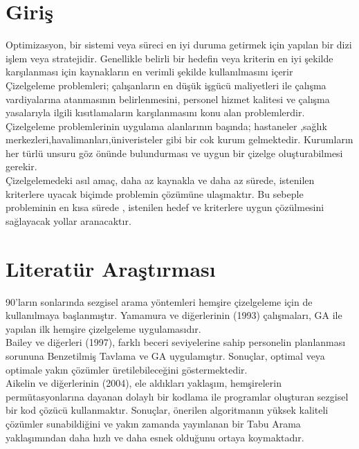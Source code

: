 \documentclass[12pt, a4paper]{article}
\begin{document}
\begin{flushleft}
   \section{Giriş}	
   Optimizasyon, bir sistemi veya süreci en iyi duruma getirmek için yapılan bir dizi işlem veya stratejidir. Genellikle belirli bir hedefin veya kriterin en iyi şekilde karşılanması için kaynakların en verimli şekilde kullanılmasını içerir \\[5pt]
   Çizelgeleme problemleri; çalışanların en düşük işgücü maliyetleri ile çalışma vardiyalarına	atanmasının belirlenmesini, personel hizmet kalitesi ve çalışma yasalarıyla ilgili 
   kısıtlamaların karşılanmasını konu alan problemlerdir.\\[5pt]
   
   Çizelgeleme problemlerinin uygulama alanlarının başında; hastaneler ,sağlık merkezleri,havalimanları,üniveristeler gibi bir cok kurum gelmektedir. Kurumların her türlü unsuru göz önünde bulundurması ve uygun bir çizelge oluşturabilmesi gerekir.\\[5pt] 
   
   Çizelgelemedeki asıl amaç, daha az kaynakla ve daha az sürede, istenilen kriterlere uyacak biçimde problemin çözümüne    ulaşmaktır. Bu sebeple probleminin en kısa sürede , istenilen hedef ve kriterlere uygun  çözülmesini sağlayacak yollar aranacaktır.
 




	\section{Literatür Araştırması}
	
	
	
	\cite{yamamura1993nurse}
	90'ların sonlarında sezgisel arama yöntemleri hemşire çizelgeleme için de kullanılmaya 
	başlanmıştır. Yamamura ve diğerlerinin (1993) çalışmaları, GA ile yapılan ilk hemşire 
   	çizelgeleme uygulamasıdır.\\[10pt]
	
	\cite{bailey1997using} 
    Bailey ve diğerleri (1997), farklı beceri seviyelerine sahip 
	personelin planlanması sorununa Benzetilmiş Tavlama ve GA uygulamıştır. Sonuçlar, 
	optimal veya optimale yakın çözümler üretilebileceğini göstermektedir.\\[10pt]
	

	
	
	\cite{aickelin2004indirect} 
    Aikelin ve diğerlerinin (2004), ele aldıkları yaklaşım, hemşirelerin permütasyonlarına dayanan dolaylı bir kodlama ile programlar oluşturan sezgisel bir kod çözücü kullanmaktır. Sonuçlar, önerilen algoritmanın yüksek	kaliteli çözümler sunabildiğini ve yakın zamanda yayınlanan bir Tabu Arama yaklaşımından daha hızlı ve daha esnek olduğunu ortaya koymaktadır.\\[10pt]
	

\end{flushleft}
\end{document}
